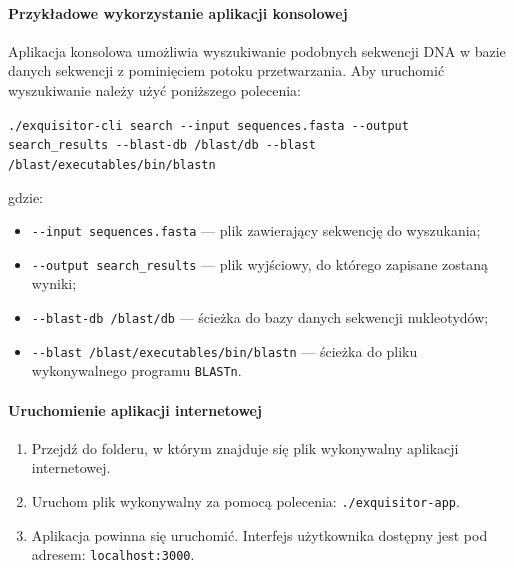             \paragraph{Przykładowe wykorzystanie aplikacji konsolowej}

                Aplikacja konsolowa umożliwia wyszukiwanie podobnych sekwencji DNA w bazie danych sekwencji z pominięciem potoku przetwarzania. Aby uruchomić wyszukiwanie należy użyć poniższego polecenia:
                
                \texttt{./exquisitor-cli search -\phantom{}-input sequences.fasta -\phantom{}-output search\_results -\phantom{}-blast-db /blast/db -\phantom{}-blast /blast/executables/bin/blastn}

                gdzie:
                \begin{itemize}
                    \item {
                        \texttt{-\phantom{}-input sequences.fasta} — plik zawierający sekwencję do wyszukania;
                    }
                    \item {
                        \texttt{-\phantom{}-output search\_results} — plik wyjściowy, do którego zapisane zostaną wyniki;
                    }
                    \item {
                        \texttt{-\phantom{}-blast-db /blast/db} — ścieżka do bazy danych sekwencji nukleotydów;
                    }
                    \item {
                        \texttt{-\phantom{}-blast /blast/executables/bin/blastn} — ścieżka do pliku wykonywalnego programu \texttt{BLASTn}.
                    }
                \end{itemize}

            \paragraph{Uruchomienie aplikacji internetowej}

                \begin{enumerate}
                    \item {
                        Przejdź do folderu, w którym znajduje się plik wykonywalny aplikacji internetowej.
                    }
                    \item {
                        Uruchom plik wykonywalny za pomocą polecenia: \texttt{./exquisitor-app}.
                    }
                    \item {
                        Aplikacja powinna się uruchomić. Interfejs użytkownika dostępny jest pod adresem: 
                        \texttt{localhost:3000}.
                    }
                \end{enumerate}

